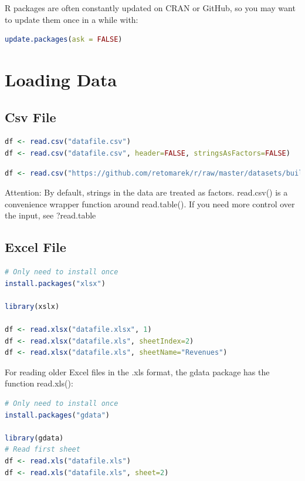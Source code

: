 \documentclass[
]{book}
\begin{document}
R packages are often constantly updated on CRAN or GitHub, so you may want to update them once in a while with:

\begin{lstlisting}[language=R]
update.packages(ask = FALSE)
\end{lstlisting}

\hypertarget{loading-data}{%
\section{Loading Data}\label{loading-data}}

\hypertarget{csv-file}{%
\subsection{Csv File}\label{csv-file}}

\begin{lstlisting}[language=R]
df <- read.csv("datafile.csv")
df <- read.csv("datafile.csv", header=FALSE, stringsAsFactors=FALSE)
\end{lstlisting}

\begin{lstlisting}[language=R]
df <- read.csv("https://github.com/retomarek/r/raw/master/datasets/buildingMonitoringTestDataSet.csv", stringsAsFactors=FALSE, sep ="," )
\end{lstlisting}

Attention: By default, strings in the data are treated as factors.
read.csv() is a convenience wrapper function around read.table(). If you need more control over the input, see ?read.table

\hypertarget{excel-file}{%
\subsection{Excel File}\label{excel-file}}

\begin{lstlisting}[language=R]
# Only need to install once
install.packages("xlsx")

library(xslx)

df <- read.xlsx("datafile.xlsx", 1)
df <- read.xlsx("datafile.xls", sheetIndex=2)
df <- read.xlsx("datafile.xls", sheetName="Revenues")
\end{lstlisting}

For reading older Excel files in the .xls format, the gdata package has the function read.xls():

\begin{lstlisting}[language=R]
# Only need to install once
install.packages("gdata")

library(gdata)
# Read first sheet
df <- read.xls("datafile.xls")
df <- read.xls("datafile.xls", sheet=2)
\end{lstlisting}
\end{document}
